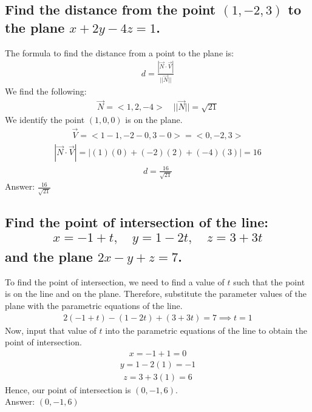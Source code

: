 \documentclass{article}
\begin{document}
\subsection{Find the distance from the point $(1,-2,3)$ to the plane $x+2y-4z=1$.}
The formula to find the distance from a point to the plane is:
\begin{align*}
	d = \frac{| \vec{N} \cdot \vec{V} | }{|| \vec{N} ||}
\end{align*}
We find the following:
\begin{align*}
	\vec{N} = <1, 2, -4> \quad || \vec{N} || = \sqrt{21}
\end{align*}
We identify the point $(1, 0, 0)$ is on the plane.
\begin{align*}
	\vec{V} = <1 -1, -2 - 0, 3 - 0> = <0, -2, 3>
\end{align*}
\begin{align*}
	| \vec{N} \cdot \vec{V} | = | (1)(0) + (-2)(2) + (-4)(3) |= 16
\end{align*}
\begin{align*}
	d = \frac{16}{\sqrt{21}}
\end{align*}
Answer: $\frac{16}{\sqrt{21}}$

\subsection{Find the point of intersection of the line:
	\begin{align*}
		x = -1 + t, \quad y = 1 - 2t, \quad z = 3 + 3t
	\end{align*}
and the plane $2x - y + z = 7$.}
To find the point of intersection, we need to find a value of $t$ such that the point is on the line and on the plane. Therefore, substitute the parameter values of the plane with the parametric equations of the line.
\begin{align*}
	2(-1 + t) - (1 - 2t) + (3 + 3t) = 7 \implies t = 1
\end{align*}
Now, input that value of $t$ into the parametric equations of the line to obtain the point of intersection.
\begin{align*}
	x = -1 + 1 = 0
\end{align*}
\begin{align*}
	y = 1 - 2(1) = -1
\end{align*}
\begin{align*}
	z = 3 + 3(1) = 6
\end{align*}
Hence, our point of intersection is $(0, -1, 6)$. \\[10pt]
Answer: $(0, -1, 6)$
\end{document}
